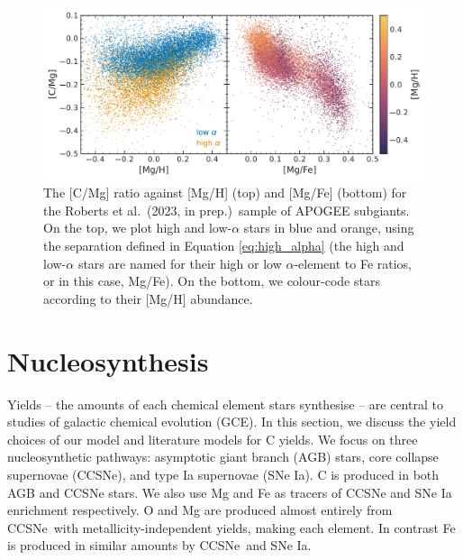 \documentclass[fleqn,usenatbib]{mnras}
\newcommand{\citetjack}{Roberts et al.~(2023, in prep.)}
\newcommand{\cc}{CCSNe}
\newcommand{\agb}{AGB}
\newcommand{\ia}{SNe Ia}
\newcommand{\apogee}{APOGEE}
\begin{document}



\begin{figure}
    \centering
    \includegraphics{subgiants.pdf}
    \caption[Subgiant Abundances]{The [C/Mg] ratio against [Mg/H] (top) and [Mg/Fe] (bottom) for the \citetjack~sample of \apogee{} subgiants. On the top, we plot high and low-$\alpha$ stars in blue and orange, using the separation defined in Equation \ref{eq:high_alpha} (the high and low-$\alpha$ stars are named for their high or low $\alpha$-element to Fe ratios, or in this case, Mg/Fe). On the bottom, we colour-code stars according to their [Mg/H] abundance.} \label{fig:subgiants}
\end{figure}








\section{Nucleosynthesis}

Yields -- the amounts of each chemical element stars synthesise -- are central to studies of galactic chemical evolution (GCE). 
In this section, we discuss the yield choices of our model and literature models for C yields. 
We focus on three nucleosynthetic pathways: asymptotic giant branch (\agb{}) stars, core collapse supernovae (\cc{}), and type Ia supernovae (\ia{}).
C is produced in both \agb{} and \cc{} stars.
We also use Mg and Fe as tracers of \cc{} and \ia{} enrichment respectively. 
O and Mg are produced almost entirely from \cc\ with metallicity-independent yields, making each element. In contrast Fe is produced in similar amounts by \cc\ and \ia.
\end{document}
